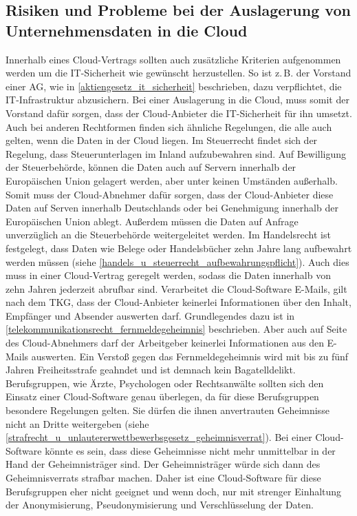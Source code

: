  \subsection{Risiken und Probleme bei der Auslagerung von Unternehmensdaten in die Cloud}
Innerhalb eines {\glqq}Cloud-Vertrags{\grqq} sollten auch zus\"atzliche Kriterien aufgenommen werden um die IT-Sicherheit wie gew\"unscht herzustellen. So ist z.\,B. der Vorstand einer AG, wie in \vref{aktiengesetz_it_sicherheit} beschrieben, dazu verpflichtet, die IT-Infrastruktur abzusichern. Bei einer Auslagerung in die Cloud, muss somit der Vorstand daf\"ur sorgen, dass der Cloud-Anbieter die IT-Sicherheit f\"ur ihn umsetzt. Auch bei anderen Rechtformen finden sich \"ahnliche Regelungen, die alle auch gelten, wenn die Daten in der Cloud liegen.\newline 
Im Steuerrecht findet sich der Regelung, dass Steuerunterlagen im Inland aufzubewahren sind. Auf Bewilligung der Steuerbeh\"orde, k\"onnen die Daten auch auf Servern innerhalb der Europ\"aischen Union gelagert werden, aber unter keinen Umst\"anden au{\ss}erhalb. Somit muss der Cloud-Abnehmer daf\"ur sorgen, dass der Cloud-Anbieter diese Daten auf Serven innerhalb Deutschlands oder bei Genehmigung innerhalb der Europ\"aischen Union ablegt. Au{\ss}erdem m\"ussen die Daten auf Anfrage unverz\"uglich an die Steuerbeh\"orde weitergeleitet werden. Im Handelsrecht ist festgelegt, dass Daten wie Belege oder Handelsb\"ucher zehn Jahre lang aufbewahrt werden m\"ussen (siehe \vref{handels_u_steuerrecht_aufbewahrungspflicht}). Auch dies muss in einer {\glqq}Cloud-Vertrag{\grqq} geregelt werden, sodass die Daten innerhalb von zehn Jahren jederzeit abrufbar sind.\newline
Verarbeitet die Cloud-Software E-Mails, gilt nach dem TKG, dass der Cloud-Anbieter keinerlei Informationen \"uber den Inhalt, Empf\"anger und Absender auswerten darf. Grundlegendes dazu ist in \vref{telekommunikationsrecht_fernmeldegeheimnis} beschrieben. Aber auch auf Seite des Cloud-Abnehmers darf der Arbeitgeber keinerlei Informationen aus den E-Mails auswerten. Ein Versto{\ss} gegen das Fernmeldegeheimnis wird mit bis zu f\"unf Jahren Freiheitsstrafe geahndet und ist demnach kein Bagatelldelikt.\newline 
Berufsgruppen, wie \"Arzte, Psychologen oder Rechtsanw\"alte sollten sich den Einsatz einer Cloud-Software genau \"uberlegen, da f\"ur diese Berufsgruppen besondere Regelungen gelten. Sie d\"urfen die ihnen anvertrauten Geheimnisse nicht an Dritte weitergeben (siehe \vref{strafrecht_u_unlautererwettbewerbsgesetz_geheimnisverrat}). Bei einer Cloud-Software k\"onnte es sein, dass diese Geheimnisse nicht mehr unmittelbar in der Hand der Geheimnistr\"ager sind. Der Geheimnistr\"ager w\"urde sich dann des Geheimnisverrats strafbar machen. Daher ist eine Cloud-Software f\"ur diese Berufsgruppen eher nicht geeignet und wenn doch, nur mit strenger Einhaltung der Anonymisierung, Pseudonymisierung und Verschl\"usselung der Daten.\newline
